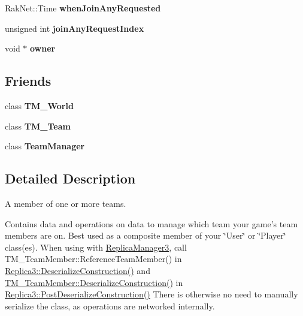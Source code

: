 \begin{DoxyCompactItemize}
\item 
\hypertarget{class_rak_net_1_1_t_m___team_member_a7e411ab3af2928b6e10ae392a180c41a}{Rak\-Net\-::\-Time {\bfseries when\-Join\-Any\-Requested}}\label{class_rak_net_1_1_t_m___team_member_a7e411ab3af2928b6e10ae392a180c41a}

\item 
\hypertarget{class_rak_net_1_1_t_m___team_member_ae997249ce42ea864d99d7fd5b7c5f988}{unsigned int {\bfseries join\-Any\-Request\-Index}}\label{class_rak_net_1_1_t_m___team_member_ae997249ce42ea864d99d7fd5b7c5f988}

\item 
\hypertarget{class_rak_net_1_1_t_m___team_member_a2c1e181128e6c945a5c20574fad64b2e}{void $\ast$ {\bfseries owner}}\label{class_rak_net_1_1_t_m___team_member_a2c1e181128e6c945a5c20574fad64b2e}

\end{DoxyCompactItemize}
\subsection*{Friends}
\begin{DoxyCompactItemize}
\item 
\hypertarget{class_rak_net_1_1_t_m___team_member_a1c849d724e23da543213088c6bc98353}{class {\bfseries T\-M\-\_\-\-World}}\label{class_rak_net_1_1_t_m___team_member_a1c849d724e23da543213088c6bc98353}

\item 
\hypertarget{class_rak_net_1_1_t_m___team_member_aca9b5a67242d34d0d5f8ceac750051f9}{class {\bfseries T\-M\-\_\-\-Team}}\label{class_rak_net_1_1_t_m___team_member_aca9b5a67242d34d0d5f8ceac750051f9}

\item 
\hypertarget{class_rak_net_1_1_t_m___team_member_afa7230b4b3ca79f8b3b50b4b5ae6034a}{class {\bfseries Team\-Manager}}\label{class_rak_net_1_1_t_m___team_member_afa7230b4b3ca79f8b3b50b4b5ae6034a}

\end{DoxyCompactItemize}


\subsection{Detailed Description}
A member of one or more teams. 

Contains data and operations on data to manage which team your game's team members are on. Best used as a composite member of your \char`\"{}\-User\char`\"{} or \char`\"{}\-Player\char`\"{} class(es). When using with \hyperlink{class_rak_net_1_1_replica_manager3}{Replica\-Manager3}, call T\-M\-\_\-\-Team\-Member\-::\-Reference\-Team\-Member() in \hyperlink{class_rak_net_1_1_replica3_a8e18c95612054b601ce0149f91a5a34d}{Replica3\-::\-Deserialize\-Construction()} and \hyperlink{class_rak_net_1_1_t_m___team_member_af6f8443d96f77d8fac58cd585ddfbb71}{T\-M\-\_\-\-Team\-Member\-::\-Deserialize\-Construction()} in \hyperlink{class_rak_net_1_1_replica3_a7d612c095fa5d81c1c6fabaa1a0f2501}{Replica3\-::\-Post\-Deserialize\-Construction()} There is otherwise no need to manually serialize the class, as operations are networked internally. 

